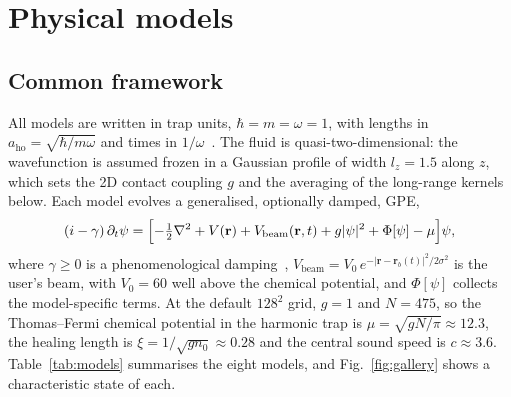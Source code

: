 \documentclass[11pt,a4paper]{article}
\begin{document}
\section{Physical models}
\label{sec:models}

\subsection{Common framework}

All models are written in trap units, $\hbar=m=\omega=1$, with lengths in $a_{\mathrm{ho}}=\sqrt{\hbar/m\omega}$ and times in $1/\omega$~\cite[\S3.8]{bbp}. The fluid is quasi-two-dimensional: the wavefunction is assumed frozen in a Gaussian profile of width $l_z=1.5$ along $z$, which sets the 2D contact coupling $g$ and the averaging of the long-range kernels below. Each model evolves a generalised, optionally damped, GPE,
\begin{equation}
(i-\gamma)\,\partial_t\psi = \Bigl[-\tfrac12\nabla^2 + V(\mathbf r) + V_{\mathrm{beam}}(\mathbf r,t) + g|\psi|^2 + \Phi[\psi] - \mu\Bigr]\psi,
\label{eq:gpe}
\end{equation}
where $\gamma\ge0$ is a phenomenological damping~\cite{choi}, $V_{\mathrm{beam}}=V_0\,e^{-|\mathbf r-\mathbf r_b(t)|^2/2\sigma^2}$ is the user's beam, with $V_0=60$ well above the chemical potential, and $\Phi[\psi]$ collects the model-specific terms. At the default $128^2$ grid, $g=1$ and $N=475$, so the Thomas--Fermi chemical potential in the harmonic trap is $\mu=\sqrt{gN/\pi}\approx12.3$, the healing length is $\xi=1/\sqrt{gn_0}\approx0.28$ and the central sound speed is $c\approx3.6$. Table~\ref{tab:models} summarises the eight models, and Fig.~\ref{fig:gallery} shows a characteristic state of each.
\end{document}
